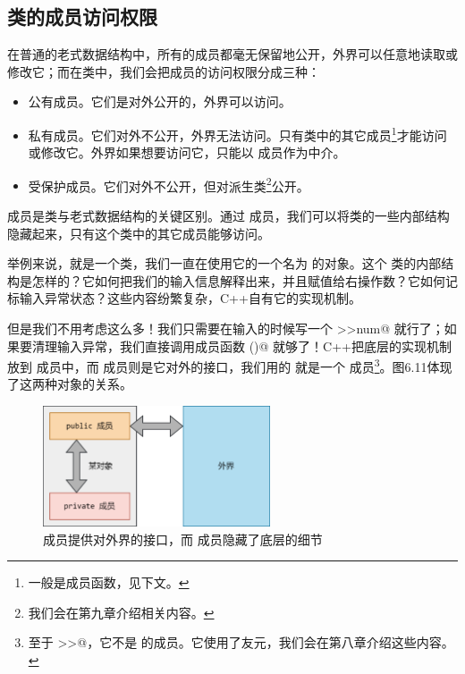 \subsection*{类的成员访问权限}
在普通的老式数据结构中，所有的成员都毫无保留地公开，外界可以任意地读取或修改它；而在类中，我们会把成员的访问权限分成三种：
\begin{itemize}
    \item \lstinline@public@ 公有成员。它们是对外公开的，外界可以访问。
    \item \lstinline@private@ 私有成员。它们对外不公开，外界无法访问。只有类中的其它成员\footnote{一般是成员函数，见下文。}才能访问或修改它。外界如果想要访问它，只能以 \lstinline@public@ 成员作为中介。
    \item \lstinline@protected@ 受保护成员。它们对外不公开，但对派生类\footnote{我们会在第九章介绍相关内容。}公开。
\end{itemize}
\lstinline@private@ 成员是类与老式数据结构的关键区别。通过 \lstinline@private@ 成员，我们可以将类的一些内部结构隐藏起来，只有这个类中的其它成员能够访问。\par
举例来说，\lstinline@istream@ 就是一个类，我们一直在使用它的一个名为 \lstinline@cin@ 的对象。这个 \lstinline@istream@ 类的内部结构是怎样的？它如何把我们的输入信息解释出来，并且赋值给右操作数？它如何记标输入异常状态？这些内容纷繁复杂，C++自有它的实现机制。\par
但是我们不用考虑这么多！我们只需要在输入的时候写一个 \lstinline@cin>>num@ 就行了；如果要清理输入异常，我们直接调用成员函数 \lstinline@clear()@ 就够了！C++把底层的实现机制放到 \lstinline@private@ 成员中，而 \lstinline@public@ 成员则是它对外的接口，我们用的 \lstinline@clear@ 就是一个 \lstinline@public@ 成员\footnote{至于 \lstinline@>>@，它不是 \lstinline@istream@ 的成员。它使用了友元，我们会在第八章介绍这些内容。}。图6.11体现了这两种对象的关系。\par
\begin{figure}[htbp]
    \centering
    \includegraphics[width=0.6\textwidth]{../images/generalized_parts/06_public_and_private_members_300.png}
    \caption{\lstinline@public@ 成员提供对外界的接口，而 \lstinline@private@ 成员隐藏了底层的细节}
\end{figure}
